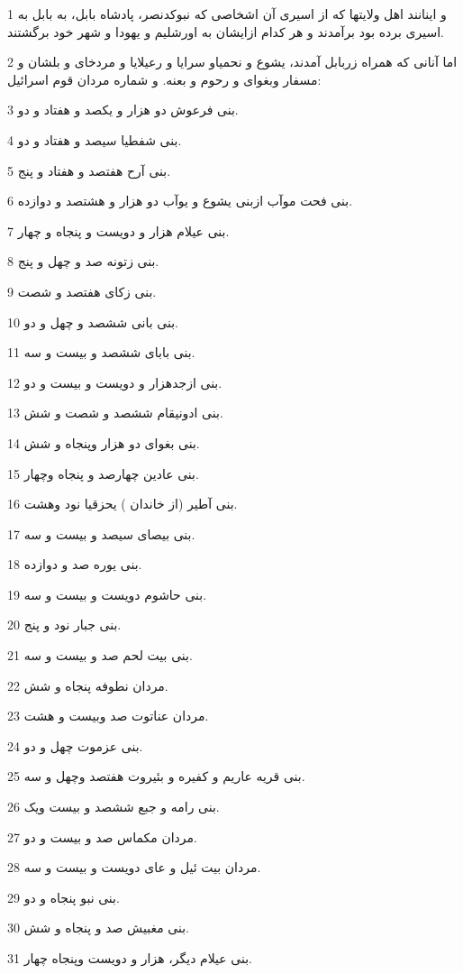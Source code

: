\par 1 و اینانند اهل ولایتها که از اسیری آن اشخاصی که نبوکدنصر، پادشاه بابل، به بابل به اسیری برده بود برآمدند و هر کدام ازایشان به اورشلیم و یهودا و شهر خود برگشتند.
\par 2 اما آنانی که همراه زربابل آمدند، یشوع و نحمیاو سرایا و رعیلایا و مردخای و بلشان و مسفار وبغوای و رحوم و بعنه. و شماره مردان قوم اسرائیل:
\par 3 بنی فرعوش دو هزار و یکصد و هفتاد و دو.
\par 4 بنی شفطیا سیصد و هفتاد و دو.
\par 5 بنی آرح هفتصد و هفتاد و پنج.
\par 6 بنی فحت موآب ازبنی یشوع و یوآب دو هزار و هشتصد و دوازده.
\par 7 بنی عیلام هزار و دویست و پنجاه و چهار.
\par 8 بنی زتونه صد و چهل و پنج.
\par 9 بنی زکای هفتصد و شصت.
\par 10 بنی بانی ششصد و چهل و دو.
\par 11 بنی بابای ششصد و بیست و سه.
\par 12 بنی ازجدهزار و دویست و بیست و دو.
\par 13 بنی ادونیقام ششصد و شصت و شش.
\par 14 بنی بغوای دو هزار وپنجاه و شش.
\par 15 بنی عادین چهارصد و پنجاه وچهار.
\par 16 بنی آطیر (از خاندان ) یحزقیا نود وهشت.
\par 17 بنی بیصای سیصد و بیست و سه.
\par 18 بنی یوره صد و دوازده.
\par 19 بنی حاشوم دویست و بیست و سه.
\par 20 بنی جبار نود و پنج.
\par 21 بنی بیت لحم صد و بیست و سه.
\par 22 مردان نطوفه پنجاه و شش.
\par 23 مردان عناتوت صد وبیست و هشت.
\par 24 بنی عزموت چهل و دو.
\par 25 بنی قریه عاریم و کفیره و بئیروت هفتصد وچهل و سه.
\par 26 بنی رامه و جبع ششصد و بیست ویک.
\par 27 مردان مکماس صد و بیست و دو.
\par 28 مردان بیت ئیل و عای دویست و بیست و سه.
\par 29 بنی نبو پنجاه و دو.
\par 30 بنی مغبیش صد و پنجاه و شش.
\par 31 بنی عیلام دیگر، هزار و دویست وپنجاه چهار.
